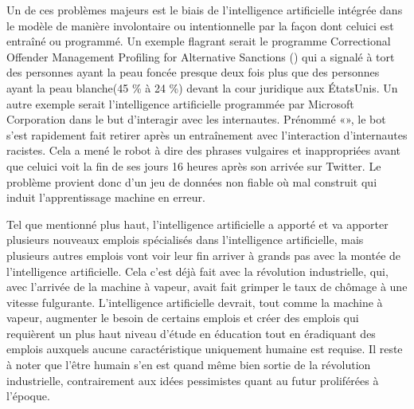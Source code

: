 \documentclass[letterpaper,10pt,french]{sphinxmanual}
\begin{document}
Un de ces  problèmes majeurs est le biais de l’intelligence artificielle intégrée dans
le modèle de manière involontaire ou intentionnelle par la façon dont celui\sphinxhyphen{}ci est entraîné
ou programmé. Un exemple flagrant serait le programme Correctional Offender Management
Profiling for Alternative Sanctions () qui a signalé à tort des personnes ayant la
peau foncée presque deux fois plus que des personnes ayant la peau blanche(45 \% à 24 \%)
devant la cour juridique aux États\sphinxhyphen{}Unis. Un autre exemple serait l’intelligence artificielle
programmée par Microsoft Corporation dans le but d’interagir avec les internautes.
Prénommé «», le bot s’est rapidement fait retirer après un entraînement avec l’interaction
d’internautes racistes. Cela a mené le robot à dire des phrases vulgaires et inappropriées
avant que celui\sphinxhyphen{}ci voit la fin de ses jours 16 heures après son arrivée sur Twitter.
Le problème provient donc d’un jeu de données non fiable où mal construit qui induit
l’apprentissage machine en erreur.

Tel que mentionné plus haut, l’intelligence artificielle a apporté et va apporter plusieurs
nouveaux emplois spécialisés dans l’intelligence artificielle, mais plusieurs autres emplois
vont voir leur fin arriver à grands pas avec la montée de l’intelligence artificielle. Cela
c’est déjà fait avec la révolution industrielle, qui, avec l’arrivée de la machine à vapeur,
avait fait grimper le taux de chômage à une vitesse fulgurante. L’intelligence artificielle
devrait, tout comme la machine à vapeur, augmenter le besoin de certains emplois et créer des
emplois qui requièrent un plus haut niveau d’étude en éducation tout en éradiquant des emplois
auxquels aucune caractéristique uniquement humaine est requise. Il reste à noter que l’être
humain s’en est quand même bien sortie de la révolution industrielle, contrairement aux idées
pessimistes quant au futur proliférées à l’époque.
\end{document}

